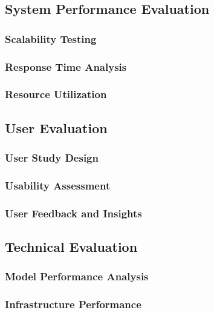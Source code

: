 \documentclass[conference]{IEEEtran}
\begin{document}
\subsection{System Performance Evaluation}

\subsubsection{Scalability Testing}

\subsubsection{Response Time Analysis}

\subsubsection{Resource Utilization}

\subsection{User Evaluation}

\subsubsection{User Study Design}

\subsubsection{Usability Assessment}

\subsubsection{User Feedback and Insights}

\subsection{Technical Evaluation}

\subsubsection{Model Performance Analysis}

\subsubsection{Infrastructure Performance}
\end{document}
